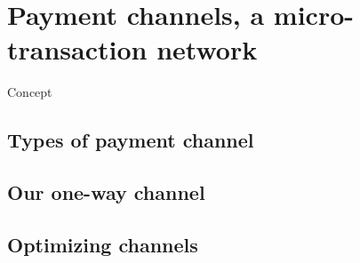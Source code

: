 \chapter{Payment channels, a micro-transaction network}
\label{chap:payment-channels}

Concept

\minitoc

\newpage

\section{Types of payment channel}


\section{Our one-way channel}


\section{Optimizing channels}

